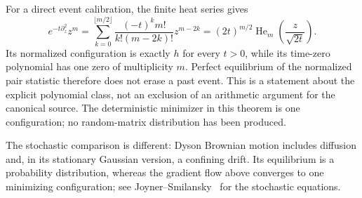 For a direct event calibration, the finite heat series gives
\begin{equation}
 e^{-t\partial_z^2}z^m
 =\sum_{k=0}^{\lfloor m/2\rfloor}
       \frac{(-t)^k m!}{k!(m-2k)!}z^{m-2k}
 =(2t)^{m/2}\operatorname{He}_m\!\left(\frac z{\sqrt{2t}}\right).
 \label{pm:exact-hermite-birth}
\end{equation}
Its normalized configuration is exactly \(h\) for every \(t>0\),
while its time-zero polynomial has one zero of multiplicity \(m\).
Perfect equilibrium of the normalized pair statistic therefore does not
erase a past event.  This is a statement about the explicit polynomial
class, not an exclusion of an arithmetic argument for the canonical
source.  The deterministic minimizer in this theorem is one configuration;
no random-matrix distribution has been produced.

The stochastic comparison is different: Dyson Brownian motion includes
diffusion and, in its stationary Gaussian version, a confining drift.
Its equilibrium is a probability distribution, whereas the gradient
flow above converges to one minimizing configuration; see
Joyner--Smilansky~\cite{sc:JoynerSmilansky2015} for the stochastic equations.
